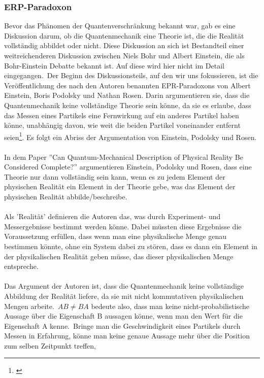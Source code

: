 \subsubsection{ERP-Paradoxon}
\label{subsubsec:erp_paradoxon}
Bevor das Phänomen der Quantenverschränkung bekannt war, gab es eine Diskussion darum, ob die Quantenmechanik eine Theorie ist, die die Realität vollständig abbildet oder nicht.
Diese Diskussion an sich ist Bestandteil einer weitreichenderen Diskussion zwischen Niels Bohr und Albert Einstein,
die als Bohr-Einstein Debatte bekannt ist. Auf diese wird hier nicht im Detail eingegangen.\ Der Beginn des Diskussionsteils, auf den wir uns fokussieren,
ist die Veröffentlichung des nach den Autoren benannten EPR-Paradoxons von Albert Einstein, Boris Podolsky und Nathan Rosen. Darin argumentieren sie, dass die Quantenmechanik keine vollständige Theorie sein könne, da sie es erlaube,
dass das Messen eines Partikels eine Fernwirkung auf ein anderes Partikel haben könne, unabhängig davon, wie weit die beiden Partikel voneinander entfernt seien\footnote{\cite{erp_1935}}. Es folgt ein Abriss der Argumentation von Einstein, Podolsky und Rosen. \\\\
In dem Paper ''Can Quantum-Mechanical Description of Physical Reality Be Considered Complete?'' argumentieren Einstein, Podolsky und Rosen, dass
eine Theorie nur dann vollständig sein kann, wenn es zu jedem Element der physischen Realität ein Element in der Theorie gebe, was das Element
der physischen Realität abbilde/beschreibe.\\\\ Als 'Realität' definieren die Autoren das, was durch Experiment- und Messergebnisse bestimmt werden könne.
Dabei müssten diese Ergebnisse die Voraussetzung erfüllen, dass wenn man eine physikalische Menge genau bestimmen könnte, ohne ein System dabei zu stören,
dass es dann ein Element in der physikalischen Realität geben müsse, das dieser physikalischen Menge entspreche.\\\\
Das Argument der Autoren ist, dass die Quantenmechanik keine vollständige Abbildung der Realität liefere, da sie mit nicht kommutativen physikalischen Mengen arbeite.\
$AB \neq BA$ bedeute also, dass man keine nicht-probabilistische Aussage über die Eigenschaft B aussagen könne, wenn man den Wert für die Eigenschaft A kenne.\ Bringe man die Geschwindigkeit eines Partikels durch Messen in Erfahrung, könne man keine genaue Aussage mehr über die Position zum selben Zeitpunkt treffen,
